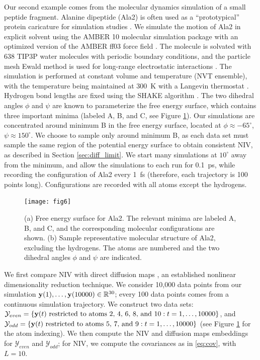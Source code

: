 Our second example comes from the molecular dynamics simulation of a small peptide fragment.
%
Alanine dipeptide (Ala2) is often used as a ``prototypical'' protein caricature for simulation studies
\cite{apostolakis1999calculation, bolhuis2000reaction, chekmarev2004long, ma2005automatic, frewen2009exploration, ferguson2011integrating}.
%
We simulate the motion of Ala2 in explicit solvent using the AMBER 10 molecular simulation package \cite{case2008Amber} with an
optimized version \cite{best2009optimized} of the AMBER ff03 force field \cite{duan2003point}.
%
The molecule is solvated with 638 TIP3P water molecules \cite{jorgensen1983comparison}
with periodic boundary conditions, and the particle mesh Ewald method is used for long-range electrostatic interactions \cite{essmann1995smooth}.
%
The simulation is performed at constant volume and temperature (NVT ensemble), with the temperature being maintained at 300~K with a Langevin thermostat \cite{loncharich1992langevin}.
%
Hydrogen bond lengths are fixed using the SHAKE algorithm \cite{ryckaert1977numerical}.
%
The two dihedral angles $\phi$ and $\psi$ are known to parameterize the free energy surface, which contains three important minima (labeled A, B, and C, see Figure \ref{fig:ala_fes}).
%
Our simulations are concentrated around minimum B in the free energy surface, located at $\phi \approx -65^{\circ}$, $\psi \approx 150^{\circ}$.
%
We choose to sample only around minimum B, as each data set must sample the same region of the potential energy surface to obtain consistent NIV, as described in Section \ref{sec:diff_limit}.
%
We start many simulations at $10^{\circ}$ away from the minimum, and allow the simulations to each run for 0.1~ps, while recording the configuration of Ala2 every 1~fs (therefore, each trajectory is 100 points long).
%
Configurations are recorded with all atoms except the hydrogens.

\begin{figure}[t]
    \texttt{[image: fig6]}
    \caption[Alanine dipeptide free energy surface and representative molecular configuration]{(a) Free energy surface for Ala2. The relevant minima are labeled A, B, and C, and the corresponding molecular configurations are shown.
    (b) Sample representative molecular structure of Ala2, excluding the hydrogens. The atoms are numbered and the two dihedral angles $\phi$ and $\psi$ are indicated.}
    \label{fig:ala_fes}
\end{figure}


We first compare NIV with direct diffusion maps \cite{coifman2005geometric}, an established nonlinear dimensionality reduction technique.
%
We consider 10,000 data points from our simulation $\mathbf{y}(1), \dots, \mathbf{y}(10000) \in \mathbb{R}^{30}$; every 100 data points comes from a continuous simulation trajectory.
%
We construct two data sets:
%
$\mathcal{Y}_{even} = \{\mathbf{y}(t) \text{ restricted to atoms 2, 4, 6, 8, and 10}: t=1, \dots, 10000 \}$,
and $\mathcal{Y}_{odd} = \{\mathbf{y}(t) \text{ restricted to atoms 5, 7, and 9}: t=1, \dots, 10000 \}$ (see Figure \ref{fig:ala_fes} for the atom indexing).
%
We then compute the NIV and diffusion maps embeddings for $\mathcal{Y}_{even}$ and $\mathcal{Y}_{odd}$;
for NIV, we compute the covariances as in \eqref{eq:cov}, with $L=10$.

